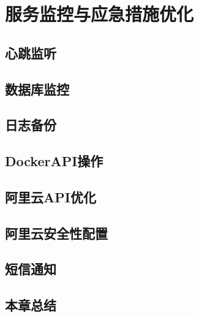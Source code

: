\chapter{服务监控与应急措施优化}
\label{cha:Monitor}
\section{心跳监听}
\section{数据库监控}
\section{日志备份}
\section{DockerAPI操作}
\section{阿里云API优化}
\section{阿里云安全性配置}
\section{短信通知}
\section{本章总结}